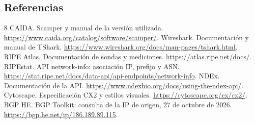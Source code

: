 \subsection{Referencias}\label{anexo:referencias}
\renewcommand{\refname}{}\begin{thebibliography}{8}
 CAIDA. Scamper y manual de la versión utilizada. \url{https://www.caida.org/catalog/software/scamper/}.
 Wireshark. Documentación y manual de TShark. \url{https://www.wireshark.org/docs/man-pages/tshark.html}.
 RIPE Atlas. Documentación de sondas y mediciones. \url{https://atlas.ripe.net/docs/}.
 RIPEstat. API network-info: asociación IP, prefijo y ASN. \url{https://stat.ripe.net/docs/data-api/api-endpoints/network-info}.
 NDEx. Documentación de la API. \url{https://www.ndexbio.org/docs/using-the-ndex-api/}.
 Cytoscape. Especificación CX2 y estilos visuales. \url{https://cytoscape.org/cx/cx2/}.
 BGP HE. BGP Toolkit: consulta de la IP de origen, 27 de octubre de 2026. \url{https://bgp.he.net/ip/186.189.89.115}.

\end{thebibliography}
